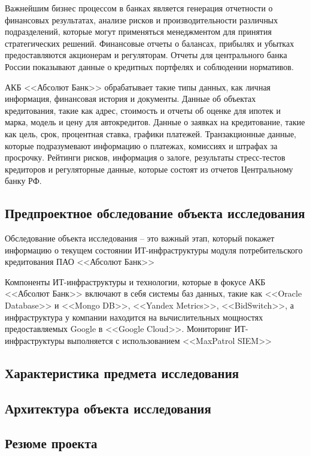 \documentclass[14pt, a4paper]{extarticle}
\begin{document}
Важнейшим бизнес процессом в банках является генерация отчетности о финансовых
результатах, анализе рисков и производительности различных подразделений,
которые могут применяться менеджментом для принятия стратегических решений.
Финансовые отчеты о балансах, прибылях и убытках предоставляются акционерам и
регуляторам. Отчеты для центрального банка России показывают данные о кредитных
портфелях и соблюдении нормативов.

АКБ <<Абсолют Банк>> обрабатывает такие типы данных, как личная информация,
финансовая история и документы. Данные об объектах кредитования, такие как
адрес, стоимость и отчеты об оценке для ипотек и марка, модель и цену для
автокредитов. Данные о заявках на кредитование, такие как цель, срок,
процентная ставка, графики платежей. Транзакционные данные, которые
подразумевают информацию о платежах, комиссиях и штрафах за просрочку. Рейтинги
рисков, информация о залоге, результаты стресс-тестов кредиторов и регуляторные
данные, которые состоят из отчетов Центральному банку РФ.

\subsection{Предпроектное обследование объекта исследования}

Обследование объекта исследования -- это важный этап, который покажет
информацию о текущем состоянии ИТ-инфраструктуры модуля потребительского
кредитования ПАО <<Абсолют Банк>>

Компоненты ИТ-инфраструктуры и технологии, которые в фокусе АКБ <<Абсолют
Банк>> включают в себя системы баз данных, такие как <<Oracle Database>> и
<<Mongo DB>>, <<Yandex Metrics>>, <<BidSwitch>>, а инфраструктура у компании
находится на вычислительных мощностях предоставляемых Google в <<Google
Cloud>>\;\cite{absolut-infrastructure-usage}. Мониторинг ИТ-инфраструктуры
выполняется с использованием <<MaxPatrol SIEM>>\;\cite{absolut-MaxPatrol-usage}


\subsection{Характеристика предмета исследования}



\subsection{Архитектура объекта исследования}



\subsection{Резюме проекта}

\begingroup 
	\let\itshape\upshape 
	\sloppy
	\raggedright
	\printbibliography[title=СПИСОК ИСПОЛЬЗУЕМЫХ ИСТОЧНИКОВ]
\endgroup
\end{document}
